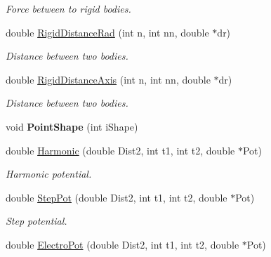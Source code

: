 \begin{DoxyCompactItemize}
\begin{DoxyCompactList}\small\item\em \-Force between to rigid bodies. \end{DoxyCompactList}\item 
\hypertarget{classForces_a4aa4b64aa78c004e13b7d5e059c61c7f}{double \hyperlink{classForces_a4aa4b64aa78c004e13b7d5e059c61c7f}{\-Rigid\-Distance\-Rad} (int n, int nn, double $\ast$dr)}\label{classForces_a4aa4b64aa78c004e13b7d5e059c61c7f}

\begin{DoxyCompactList}\small\item\em \-Distance between two bodies. \end{DoxyCompactList}\item 
\hypertarget{classForces_a0bd8b1fc300bbbf7b4d7a6c5836ff0dc}{double \hyperlink{classForces_a0bd8b1fc300bbbf7b4d7a6c5836ff0dc}{\-Rigid\-Distance\-Axis} (int n, int nn, double $\ast$dr)}\label{classForces_a0bd8b1fc300bbbf7b4d7a6c5836ff0dc}

\begin{DoxyCompactList}\small\item\em \-Distance between two bodies. \end{DoxyCompactList}\item 
\hypertarget{classForces_a0d76b871ebe7ef570ef9c2fcba03ddb8}{void {\bfseries \-Point\-Shape} (int i\-Shape)}\label{classForces_a0d76b871ebe7ef570ef9c2fcba03ddb8}

\item 
\hypertarget{classForces_af449f7871a4d5c5f1e263e4fe660bd63}{double \hyperlink{classForces_af449f7871a4d5c5f1e263e4fe660bd63}{\-Harmonic} (double \-Dist2, int t1, int t2, double $\ast$\-Pot)}\label{classForces_af449f7871a4d5c5f1e263e4fe660bd63}

\begin{DoxyCompactList}\small\item\em \-Harmonic potential. \end{DoxyCompactList}\item 
\hypertarget{classForces_a1f0b019b2a8c81938b8f4a3f3ddcfc48}{double \hyperlink{classForces_a1f0b019b2a8c81938b8f4a3f3ddcfc48}{\-Step\-Pot} (double \-Dist2, int t1, int t2, double $\ast$\-Pot)}\label{classForces_a1f0b019b2a8c81938b8f4a3f3ddcfc48}

\begin{DoxyCompactList}\small\item\em \-Step potential. \end{DoxyCompactList}\item 
\hypertarget{classForces_ad1ef4b910c2f6e057b8b2e079d32100b}{double \hyperlink{classForces_ad1ef4b910c2f6e057b8b2e079d32100b}{\-Electro\-Pot} (double \-Dist2, int t1, int t2, double $\ast$\-Pot)}\label{classForces_ad1ef4b910c2f6e057b8b2e079d32100b}


\end{DoxyCompactItemize}
